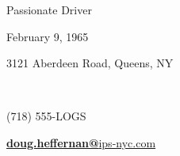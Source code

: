 \documentclass[]{friggeri-cv_reccius-experiment}
\begin{document}
      {Passionate Driver}

\vspace{0.3cm}
\color{lightgray}\noindent\makebox[\textwidth]{\rule{\paperwidth-0.4cm}{2.5pt}}


\begin{info}
    \begin{flushleft}
    {{\small February 9, 1965}\hfill{\LARGE \textborn\thinspace\thinspace\verythinspace}\\

    \vspace{0.11cm}

    \small 3121 Aberdeen Road, Queens, NY}\hfill{\Large\faMapMarker\thinspace\thinspace\thinspace}\\

    \vspace{0.08cm}

    {\small (718) 555-LOGS}\hfill{\LARGE\Mobilefone\thinspace}\\

    \vspace{0.14cm}

    \href{mailto:doug.heffernan@international-parcel-service.com}{{\small\textbf{doug.heffernan@}ips-nyc.com}\hfill{\Large\Letter}\hspace{0.6mm}{\small \faMousePointer}}\\

    \end{flushleft}
\end{info}
\end{document}

